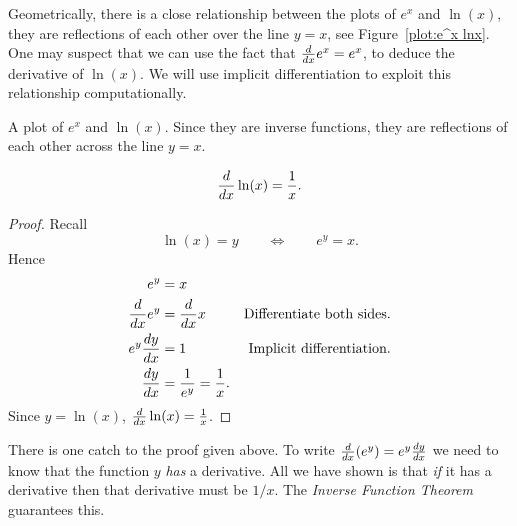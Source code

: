 Geometrically, there is a close relationship between the plots of
$e^x$ and $\ln(x)$, they are reflections of each other over the line
$y=x$, see Figure~\ref{plot:e^x lnx}. One may suspect that we can use the fact
that $\frac{d}{dx} e^x = e^x$, to deduce the derivative of $\ln(x)$.  We will
use implicit differentiation to exploit this relationship
computationally.

\begin{marginfigure}
\caption{A plot of $e^x$ and $\ln(x)$. Since they are inverse
  functions, they are reflections of each other across the line $y=x$.}
\label{plot:e^x lnx}
\end{marginfigure}


\begin{mainTheorem}
\[
\frac{d}{dx} \ln(x) = \frac{1}{x}.
\]
\end{mainTheorem}
\begin{proof}
Recall
\[
\ln(x) = y \qquad\Leftrightarrow\qquad e^y = x.
\]
Hence
\begin{align*}
e^y &= x\\
\frac{d}{dx} e^y &= \frac{d}{dx} x &\text{Differentiate both sides.}\\
e^y \frac{dy}{dx} &= 1 &\text{Implicit differentiation.}\\
\frac{dy}{dx} &= \frac{1}{e^y} = \frac{1}{x}.
\end{align*}
Since $y=\ln(x)$, $\frac{d}{dx} \ln(x) = \frac{1}{x}$.
\end{proof}

There is one catch to the proof given above. To write
$\frac{d}{dx}(e^y)=e^y\frac{dy}{dx}$ we need to know that the function $y$
\textit{has} a derivative. All we have shown is that \textit{if} it
has a derivative then that derivative must be $1/x$. The \textit{Inverse
Function Theorem} guarantees this.

